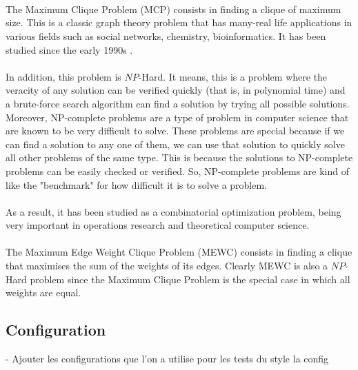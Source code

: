 \\ \\ \\
The Maximum Clique Problem (MCP) consists in finding a clique of maximum size. This is a classic graph theory problem that has many-real life applications in various fields such as social networks, chemistry, bioinformatics. It has been studied since the early 1990s \cite{mewcf}.
\\ \\
In addition, this problem is $NP$-Hard. It means, this is a problem where the veracity of any solution can be verified quickly (that is, in polynomial time) and a brute-force search algorithm can find a solution by trying all possible solutions. Moreover, NP-complete problems are a type of problem in computer science that are known to be very difficult to solve. These problems are special because if we can find a solution to any one of them, we can use that solution to quickly solve all other problems of the same type. This is because the solutions to NP-complete problems can be easily checked or verified. So, NP-complete problems are kind of like the "benchmark" for how difficult it is to solve a problem.
\\ \\
As a result, it has been studied as a combinatorial optimization problem, being very important in operations research and theoretical computer science.
\\ \\
The Maximum Edge Weight Clique Problem (MEWC) consists in finding a clique that maximises the sum of the weights of its edges. Clearly MEWC is also a $NP$-Hard problem since the Maximum Clique Problem is the special case in which all weights are equal.


\subsection{Configuration}

-  Ajouter les configurations que l'on a utilise pour les tests du style la config\\ \\

